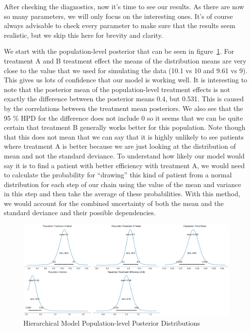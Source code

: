 \documentclass[12pt,a4paper,leqno]{report}
\theoremstyle{plain}
\theoremstyle{definition}
\theoremstyle{remark}
\begin{document}
After checking the diagnostics, now it's time to see our results. As there are
now so many parameters, we will only focus on the interesting ones. It's of course always
advisable to check every parameter to make sure that the results seem realistic,
but we skip this here for brevity and clarity.

We start with the population-level posterior that can be seen in figure\
\ref{hierarchicalmodelpopulationposteriors}. For treatment A and B treatment effect the means of the
distribution means are very close to the value that we used for simulating the data (10.1
vs 10 and 9.61 vs 9). This gives us lots of confidence that our
model is working well. It is interesting to note that the
posterior mean of the population-level treatment effects is not exactly the difference
between the posterior means 0.4, but 0.531. This is caused by the correlations between
the treatment mean posteriors. We also see that the 95 \% HPD for the difference does not include 0
so it seems that we can be quite certain that treatment B
generally works better for this population. Note though that this does not mean that we can say that it is highly
unlikely to see patients where treatment A is better because we are just looking at the
distribution of mean and not the standard deviance. To understand how likely our model
would say it is to find a patient with better efficiency with treatment A, we would need
to calculate the probability for ``drawing'' this kind of patient from a normal
distribution for each step of our chain using the value of the mean and variance in this
step and then take the average of these probabilities. With this method, we would
account for the combined uncertainty of both the mean and
the standard deviance and their possible dependencies.

\bigskip
\begin{figure}[H]
    \caption{Hierarchical Model Population-level Posterior Distributions}\label{hierarchicalmodelpopulationposteriors}
    \bigskip
    \includegraphics[width=\textwidth,height=\textheight,keepaspectratio]{hierarchical_model_population_level_posteriors.pdf}
\end{figure}
\bigskip
\end{document}
